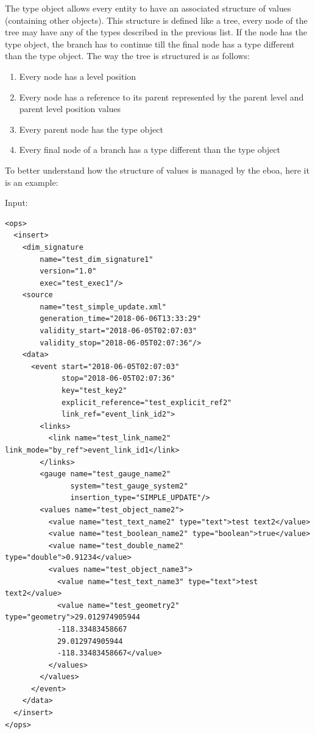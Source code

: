 The type object allows every entity to have an associated structure of values (containing other objects). This structure is defined like a tree, every node of the tree may have any of the types described in the previous list. If the node has the type object, the branch has to continue till the final node has a type different than the type object.
The way the tree is structured is as follows:

\begin{enumerate}

\item Every node has a level position
\item Every node has a reference to its parent represented by the parent level and parent level position values
\item Every parent node has the type object
\item Every final node of a branch has a type different than the type object

\end{enumerate}

To better understand how the structure of values is managed by the \acrshort{eboa}, here it is an example:

Input:
\begin{lstlisting}[style=xml, caption={XML input example for showing the values structure management.}]
<ops>
  <insert>
    <dim_signature
        name="test_dim_signature1"
        version="1.0"
        exec="test_exec1"/>
    <source
        name="test_simple_update.xml" 
        generation_time="2018-06-06T13:33:29"
        validity_start="2018-06-05T02:07:03"
        validity_stop="2018-06-05T02:07:36"/>
    <data>
      <event start="2018-06-05T02:07:03"
             stop="2018-06-05T02:07:36"
             key="test_key2"
             explicit_reference="test_explicit_ref2"
             link_ref="event_link_id2">
        <links>
          <link name="test_link_name2" link_mode="by_ref">event_link_id1</link>
        </links>
        <gauge name="test_gauge_name2"
               system="test_gauge_system2"
               insertion_type="SIMPLE_UPDATE"/>
        <values name="test_object_name2">
          <value name="test_text_name2" type="text">test text2</value>
          <value name="test_boolean_name2" type="boolean">true</value>
          <value name="test_double_name2" type="double">0.91234</value>
          <values name="test_object_name3">
            <value name="test_text_name3" type="text">test text2</value>
            <value name="test_geometry2" type="geometry">29.012974905944
            -118.33483458667
            29.012974905944
            -118.33483458667</value>
          </values>
        </values>
      </event>
    </data>
  </insert>
</ops>
\end{lstlisting}


